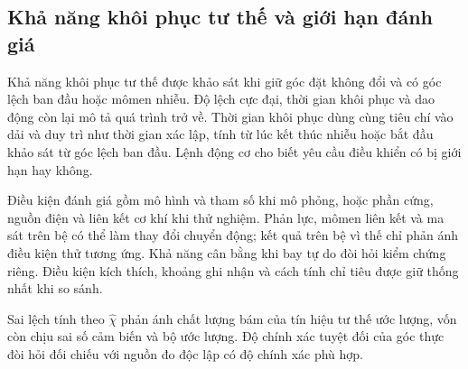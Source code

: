 
\subsection{Khả năng khôi phục tư thế và giới hạn đánh giá}

Khả năng khôi phục tư thế được khảo sát khi giữ góc đặt không đổi và có góc lệch ban đầu hoặc mômen nhiễu. Độ lệch cực đại, thời gian khôi phục và dao động còn lại mô tả quá trình trở về. Thời gian khôi phục dùng cùng tiêu chí vào dải và duy trì như thời gian xác lập, tính từ lúc kết thúc nhiễu hoặc bắt đầu khảo sát từ góc lệch ban đầu. Lệnh động cơ cho biết yêu cầu điều khiển có bị giới hạn hay không.

Điều kiện đánh giá gồm mô hình và tham số khi mô phỏng, hoặc phần cứng, nguồn điện và liên kết cơ khí khi thử nghiệm. Phản lực, mômen liên kết và ma sát trên bệ có thể làm thay đổi chuyển động; kết quả trên bệ vì thế chỉ phản ánh điều kiện thử tương ứng. Khả năng cân bằng khi bay tự do đòi hỏi kiểm chứng riêng. Điều kiện kích thích, khoảng ghi nhận và cách tính chỉ tiêu được giữ thống nhất khi so sánh.

Sai lệch tính theo $\hat\chi$ phản ánh chất lượng bám của tín hiệu tư thế ước lượng, vốn còn chịu sai số cảm biến và bộ ước lượng. Độ chính xác tuyệt đối của góc thực đòi hỏi đối chiếu với nguồn đo độc lập có độ chính xác phù hợp.

